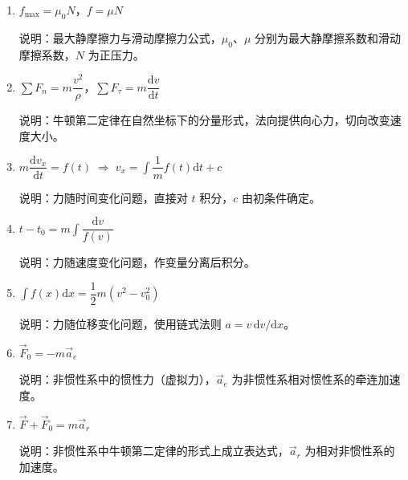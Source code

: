 \documentclass[12pt,a4paper]{ctexart}
\begin{document}
\begin{enumerate}[leftmargin=3em,label=\textbf{公式\arabic*}：,ref=公式\arabic*]
    \item $f_{\max} = \mu_0 N$，$f = \mu N$

    说明：最大静摩擦力与滑动摩擦力公式，$\mu_0$、$\mu$ 分别为最大静摩擦系数和滑动摩擦系数，$N$ 为正压力。

    \item $\displaystyle\sum F_n = m\dfrac{v^2}{\rho}$，$\displaystyle\sum F_\tau = m\dfrac{\mathrm{d}v}{\mathrm{d}t}$

    说明：牛顿第二定律在自然坐标下的分量形式，法向提供向心力，切向改变速度大小。

    \item $m\dfrac{\mathrm{d}v_x}{\mathrm{d}t} = f(t) \;\Rightarrow\; v_x = \displaystyle\int \dfrac{1}{m}f(t)\mathrm{d}t + c$

    说明：力随时间变化问题，直接对 $t$ 积分，$c$ 由初条件确定。

    \item $t - t_0 = m\displaystyle\int \dfrac{\mathrm{d}v}{f(v)}$

    说明：力随速度变化问题，作变量分离后积分。

    \item $\displaystyle\int f(x)\mathrm{d}x = \dfrac{1}{2}m(v^2 - v_0^2)$

    说明：力随位移变化问题，使用链式法则 $a = v\,\mathrm{d}v/\mathrm{d}x$。

    \item $\vec{F}_0 = -m\vec{a}_e$

    说明：非惯性系中的惯性力（虚拟力），$\vec{a}_e$ 为非惯性系相对惯性系的牵连加速度。

    \item $\vec{F} + \vec{F}_0 = m\vec{a}_r$

    说明：非惯性系中牛顿第二定律的形式上成立表达式，$\vec{a}_r$ 为相对非惯性系的加速度。

\end{enumerate}
\end{document}
